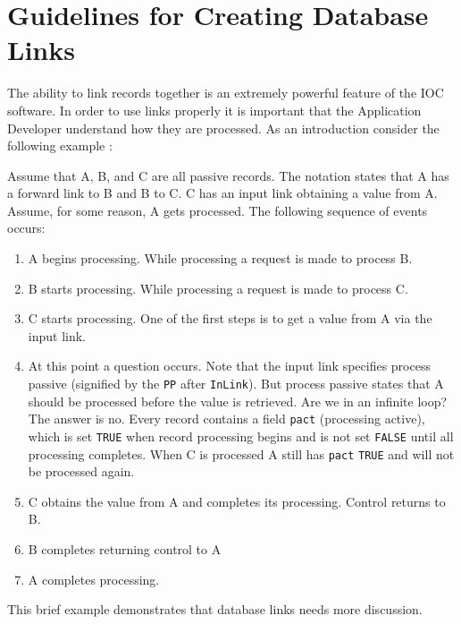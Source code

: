 \section{Guidelines for Creating Database Links}

The ability to link records together is an extremely powerful feature of the IOC software. In order to use links properly it 
is important that the Application Developer understand how they are processed. As an introduction consider the following 
example :

Assume that A, B, and C are all passive records. The notation states that A has a forward link to B and B to C. C has an 
input link obtaining a value from A. Assume, for some reason, A gets processed. The following sequence of events 
occurs:

\begin{enumerate}\item A begins processing. While processing a request is made to process B.

\item B starts processing. While processing a request is made to process C.

\item C starts processing. One of the first steps is to get a value from A via the input link.

\item At this point a question occurs. Note that the input link specifies process passive (signified by the \verb|PP| after 
\verb|InLink|). But process passive states that A should be processed before the value is retrieved. Are we in an infinite 
loop? The answer is no. Every record contains a field \verb|pact| (processing active), which is set \verb|TRUE| when record 
processing begins and is not set \verb|FALSE| until all processing completes. When C is processed A still has \verb|pact| \verb|TRUE| 
and will not be processed again.

\item C obtains the value from A and completes its processing. Control returns to B.

\item B completes returning control to A

\item A completes processing.

\end{enumerate}This brief example demonstrates that database links needs more discussion.

